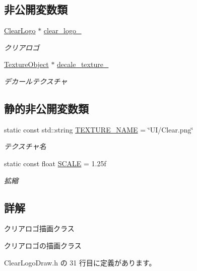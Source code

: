 \subsection*{非公開変数類}
\begin{DoxyCompactItemize}
\item 
\mbox{\hyperlink{class_clear_logo}{Clear\+Logo}} $\ast$ \mbox{\hyperlink{class_clear_logo_draw_a9cfe2a7655dbda11e6a9719943022327}{clear\+\_\+logo\+\_\+}}
\begin{DoxyCompactList}\small\item\em クリアロゴ \end{DoxyCompactList}\item 
\mbox{\hyperlink{class_texture_object}{Texture\+Object}} $\ast$ \mbox{\hyperlink{class_clear_logo_draw_a4fdf733ac28fe6dd10e9899b808ddcf4}{decale\+\_\+texture\+\_\+}}
\begin{DoxyCompactList}\small\item\em デカールテクスチャ \end{DoxyCompactList}\end{DoxyCompactItemize}
\subsection*{静的非公開変数類}
\begin{DoxyCompactItemize}
\item 
static const std\+::string \mbox{\hyperlink{class_clear_logo_draw_aea89948b2e9b540fe35f1c910824c82f}{T\+E\+X\+T\+U\+R\+E\+\_\+\+N\+A\+ME}} = \char`\"{}UI/Clear.\+png\char`\"{}
\begin{DoxyCompactList}\small\item\em テクスチャ名 \end{DoxyCompactList}\item 
static const float \mbox{\hyperlink{class_clear_logo_draw_afdf263982add6dd6b8ac167b3ef44dc0}{S\+C\+A\+LE}} = 1.\+25f
\begin{DoxyCompactList}\small\item\em 拡縮 \end{DoxyCompactList}\end{DoxyCompactItemize}


\subsection{詳解}
クリアロゴ描画クラス 

クリアロゴの描画クラス 

 Clear\+Logo\+Draw.\+h の 31 行目に定義があります。



